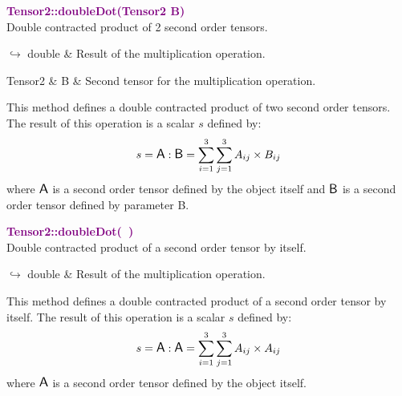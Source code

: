\textcolor{purple}{\textbf{Tensor2::doubleDot(Tensor2 B)}}\label{Tensor2::doubleDot(Tensor2 B)}\\
Double contracted product of 2 second order tensors.\vspace*{-0.5em}
\begin{tcolorbox}[grow to left by=-1cm, width=\textwidth-1cm,myArgs,tabularx={l|R}]
$\hookrightarrow$ double & Result of the multiplication operation.
\end{tcolorbox}

\begin{tcolorbox}[width=\textwidth,myArgs,tabularx={ll|R}]
Tensor2 & B & Second tensor for the multiplication operation.
\end{tcolorbox}

This method defines a double contracted product of two second order tensors.
The result of this operation is a scalar $s$ defined by:
\begin{equation*}
s = \mbox{\large\ensuremath{\mathsf{A}}} : \mbox{\large\ensuremath{\mathsf{B}}} = \sum_{i=1}^{3} \sum_{j=1}^{3} A_{ij}\times B_{ij}
\end{equation*}
where $\mbox{\large\ensuremath{\mathsf{A}}}$ is a second order tensor defined by the object itself and $\mbox{\large\ensuremath{\mathsf{B}}}$ is a second order tensor defined by parameter B.

\textcolor{purple}{\textbf{Tensor2::doubleDot(~)}}\label{Tensor2::doubleDot()}\\
Double contracted product of a second order tensor by itself.\vspace*{-0.5em}
\begin{tcolorbox}[grow to left by=-1cm, width=\textwidth-1cm,myArgs,tabularx={l|R}]
$\hookrightarrow$ double & Result of the multiplication operation.
\end{tcolorbox}

This method defines a double contracted product of a second order tensor by itself.
The result of this operation is a scalar $s$ defined by:
\begin{equation*}
s = \mbox{\large\ensuremath{\mathsf{A}}} : \mbox{\large\ensuremath{\mathsf{A}}} = \sum_{i=1}^{3} \sum_{j=1}^{3} A_{ij}\times A_{ij}
\end{equation*}
where $\mbox{\large\ensuremath{\mathsf{A}}}$ is a second order tensor defined by the object itself.

